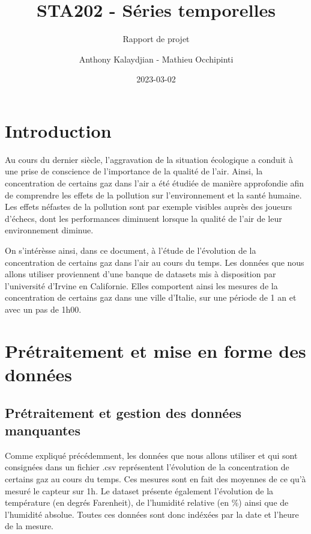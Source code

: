 \documentclass[
]{article}
\title{STA202 - Séries temporelles}
\subtitle{Rapport de projet}
\author{Anthony Kalaydjian - Mathieu Occhipinti}
\date{2023-03-02}
\begin{document}
\maketitle

\newpage
\thispagestyle{empty}

\mbox{}

\tableofcontents

\newpage
\thispagestyle{empty}

\mbox{}

\hypertarget{introduction}{%
\section{Introduction}\label{introduction}}

Au cours du dernier siècle, l'aggravation de la situation écologique a
conduit à une prise de conscience de l'importance de la qualité de
l'air. Ainsi, la concentration de certains gaz dans l'air a été étudiée
de manière approfondie afin de comprendre les effets de la pollution sur
l'environnement et la santé humaine. Les effets néfastes de la pollution
sont par exemple visibles auprès des joueurs d'échecs, dont les
performances diminuent lorsque la qualité de l'air de leur environnement
diminue.

On s'intérèsse ainsi, dans ce document, à l'étude de l'évolution de la
concentration de certains gaz dans l'air au cours du temps. Les données
que nous allons utiliser proviennent d'une banque de datasets mis à
disposition par l'université d'Irvine en Californie. Elles comportent
ainsi les mesures de la concentration de certains gaz dans une ville
d'Italie, sur une période de 1 an et avec un pas de 1h00.

\hypertarget{pruxe9traitement-et-mise-en-forme-des-donnuxe9es}{%
\section{Prétraitement et mise en forme des
données}\label{pruxe9traitement-et-mise-en-forme-des-donnuxe9es}}

\hypertarget{pruxe9traitement-et-gestion-des-donnuxe9es-manquantes}{%
\subsection{Prétraitement et gestion des données
manquantes}\label{pruxe9traitement-et-gestion-des-donnuxe9es-manquantes}}

Comme expliqué précédemment, les données que nous allons utiliser et qui
sont consignées dans un fichier .csv représentent l'évolution de la
concentration de certains gaz au cours du temps. Ces mesures sont en
fait des moyennes de ce qu'à mesuré le capteur sur 1h. Le dataset
présente également l'évolution de la température (en degrés Farenheit),
de l'humidité relative (en \%) ainsi que de l'humidité absolue. Toutes
ces données sont donc indéxées par la date et l'heure de la mesure.
\end{document}
